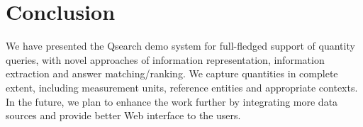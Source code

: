 

\section{Conclusion}
\label{sec:conclusion}

We have presented the Qsearch demo system for full-fledged support of
quantity queries, with novel approaches of information representation, information extraction and answer matching/ranking.
We capture quantities in complete extent, including measurement units, reference entities and appropriate contexts.
In the future, we plan to enhance the work further by integrating more data sources and provide better Web interface to the users.

